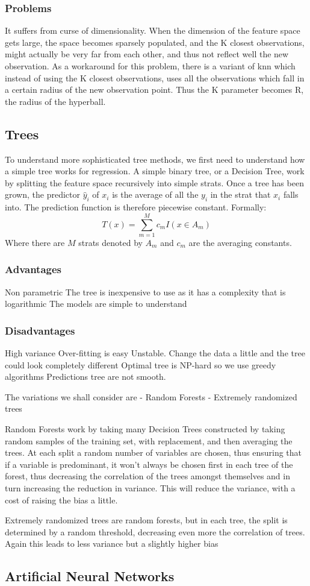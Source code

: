 \subsubsection{Problems}
It suffers from curse of dimensionality. When the dimension of the feature space gets large, the space becomes sparsely populated, and the K closest observations, might actually be very far from each other, and thus not reflect well the new observation.
As a workaround for this problem, there is a variant of \acrshort{knn} which instead of using the K closest observations, uses all the observations which fall in a certain radius of the new observation point. Thus the K parameter becomes R, the radius of the hyperball.

\subsection{Trees}
To understand more sophisticated tree methods, we first need to understand how a simple tree works for regression.
A simple binary tree, or a Decision Tree, work by splitting the feature space recursively into simple strats. Once a tree has been grown, the predictor $\hat{y}_i$ of $x_i$ is the average of all the $y_i$ in the strat that $x_i$ falls into. The prediction function is therefore piecewise constant.
Formally:
$$
T(x) = \sum_{m=1}^M c_m I(x \in A_m)
$$
Where there are $M$ strats denoted by $A_m$ and $c_m$ are the averaging constants.

\subsubsection{Advantages}
Non parametric
The tree is inexpensive to use as it has a complexity that is logarithmic
The models are simple to understand
\subsubsection{Disadvantages}
High variance
Over-fitting is easy
Unstable. Change the data a little and the tree could look completely different
Optimal tree is NP-hard so we use greedy algorithms
Predictions tree are not smooth.


The variations we shall consider are
- Random Forests
- Extremely randomized trees

Random Forests work by taking many Decision Trees constructed by taking random samples of the training set, with replacement, and then averaging the trees. At each split a random number of variables are chosen, thus ensuring that if a variable is predominant, it won't always be chosen first in each tree of the forest, thus decreasing the correlation of the trees amongst themselves and in turn increasing the reduction in variance.
This will reduce the variance, with a cost of raising the bias a little.

Extremely randomized trees are random forests, but in each tree, the split is determined by a random threshold, decreasing even more the correlation of trees. 
Again this leads to less variance but a slightly higher bias

\subsection{Artificial Neural Networks}